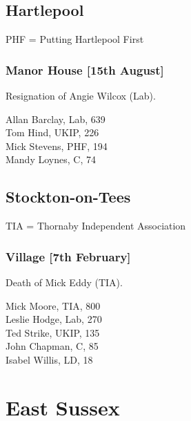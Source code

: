 \documentclass[a4paper,openany,10pt]{book}
\begin{document}
\subsection*{Hartlepool}

PHF = Putting Hartlepool First

\subsubsection*{Manor House \hspace*{\fill}\nolinebreak[1]%
\enspace\hspace*{\fill}
[15th August]}


Resignation of Angie Wilcox (Lab).



Allan Barclay, Lab, 639\\
Tom Hind, UKIP, 226\\
Mick Stevens, PHF, 194\\
Mandy Loynes, C, 74\\


\subsection*{Stockton-on-Tees}

TIA = Thornaby Independent Association

\subsubsection*{Village \hspace*{\fill}\nolinebreak[1]%
\enspace\hspace*{\fill}
[7th February]}


Death of Mick Eddy (TIA).



Mick Moore, TIA, 800\\
Leslie Hodge, Lab, 270\\
Ted Strike, UKIP, 135\\
John Chapman, C, 85\\
Isabel Willis, LD, 18\\


\vfill

\section{East Sussex}
\end{document}
